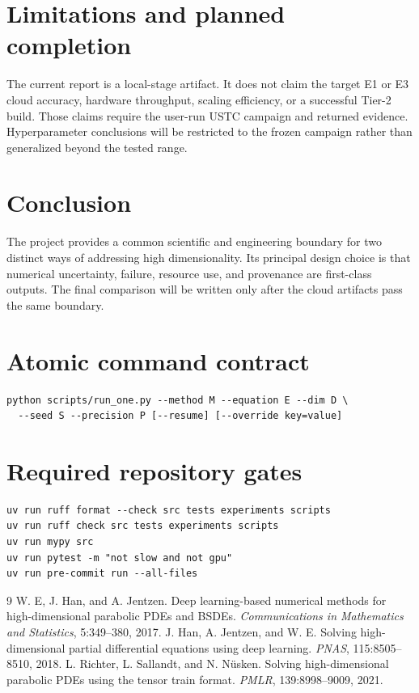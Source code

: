 \documentclass[11pt]{article}
\begin{document}
\section{Limitations and planned completion}
The current report is a local-stage artifact. It does not claim the target E1 or E3 cloud
accuracy, hardware throughput, scaling efficiency, or a successful Tier-2 build. Those
claims require the user-run USTC campaign and returned evidence. Hyperparameter conclusions
will be restricted to the frozen campaign rather than generalized beyond the tested range.

\section{Conclusion}
The project provides a common scientific and engineering boundary for two distinct ways of
addressing high dimensionality. Its principal design choice is that numerical uncertainty,
failure, resource use, and provenance are first-class outputs. The final comparison will be
written only after the cloud artifacts pass the same boundary.

\appendix
\section{Atomic command contract}
\begin{verbatim}
python scripts/run_one.py --method M --equation E --dim D \
  --seed S --precision P [--resume] [--override key=value]
\end{verbatim}

\section{Required repository gates}
\begin{verbatim}
uv run ruff format --check src tests experiments scripts
uv run ruff check src tests experiments scripts
uv run mypy src
uv run pytest -m "not slow and not gpu"
uv run pre-commit run --all-files
\end{verbatim}

\begin{thebibliography}{9}
 W. E, J. Han, and A. Jentzen. Deep learning-based numerical methods
for high-dimensional parabolic PDEs and BSDEs. \emph{Communications in Mathematics
and Statistics}, 5:349--380, 2017.
 J. Han, A. Jentzen, and W. E. Solving high-dimensional partial
differential equations using deep learning. \emph{PNAS}, 115:8505--8510, 2018.
\bibitem{richter2021} L. Richter, L. Sallandt, and N. N\"usken. Solving high-dimensional
parabolic PDEs using the tensor train format. \emph{PMLR}, 139:8998--9009, 2021.
\end{thebibliography}
\end{document}
